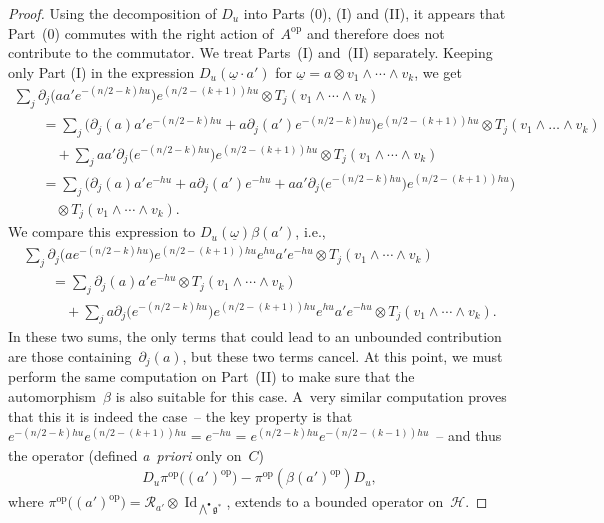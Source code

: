 \documentclass[11pt]{article}
\newcommand{\Core}{C}
\newcommand{\Hh}{\mathscr{H}}
\newcommand{\LieG}{\mathfrak{g}}
\newcommand{\omegat}{\underline{\omega}}
\newcommand{\RightMult}{\mathcal{R}}
\DeclareMathOperator{\id}{Id}
\numberwithin{equation}{section}
\begin{document}
\begin{proof}
Using the decomposition of $D_u$ into Parts (0), (I) and (II), it appears that Part~(0) commutes with the right action of~$A^\text{op}$ and therefore does not contribute to the commutator. We treat Parts~(I) and~(II) separately. Keeping only Part (I) in the expression $D_u( \omegat \cdot a')$ for $\omegat = a \otimes v_1 \wedge \cdots \wedge v_k$, we get
\begin{gather*}
\sum_j \partial_j\big(a a' e^{-(n/2 - k)h u} \big) e^{(n/2 - (k+1))h u} \otimes T_j( v_1 \wedge \cdots \wedge v_k) \\
\qquad{}
= \sum_j \big(\partial_j( a) a' e^{-(n/2 - k)h u} + a \partial_j(a') e^{-(n/2 - k)h u}\big) e^{(n/2 - (k+1))h u}
 \otimes T_j( v_1 \wedge \ldots \wedge v_k) \\
 \qquad\quad{}
+ \sum_{j} a a' \partial _j\big(e^{-(n/2 - k)h u}\big) e^{(n/2 - (k+1))h u} \otimes T_j(v_1 \wedge \cdots \wedge v_k)\\
\qquad{}
= \sum_{j} \big(\partial _j(a) a' e^{- h u} + a \partial _j(a') e^{-hu} + a a' \partial _j\big(e^{-(n/2 - k)h u}\big) e^{(n/2 - (k+1))h u} \big)\\
\qquad\quad{}
 \otimes T_j(v_1 \wedge \cdots \wedge v_k).
\end{gather*}
We compare this expression to $D_u(\omegat) \beta(a')$, i.e.,
\begin{gather*}
\sum_j \partial_j\big(a e^{-(n/2 - k)h u} \big) e^{(n/2 - (k+1))h u} e^{h u} a' e^{-hu} \otimes T_j( v_1 \wedge \cdots \wedge v_k) \\
\qquad{}= \sum_j \partial_j(a) a' e^{-h u} \otimes T_j( v_1 \wedge \cdots \wedge v_k) \\
\qquad\quad{} + \sum_{j} a \partial _j\big(e^{-(n/2 - k)h u} \big) e^{(n/2 - (k+1))h u} e^{h u} a' e^{-hu} \otimes T_j( v_1 \wedge \cdots \wedge v_k).
\end{gather*}
In these two sums, the only terms that could lead to an unbounded contribution are those containing~$\partial _j(a)$, but these two terms cancel. At this point, we must perform the same computation on Part~(II) to make sure that the automorphism~$\beta$ is also suitable for this case. A~very similar computation proves that this it is indeed the case~-- the key property is that $e^{-(n/2 - k)h u} e^{(n/2 - (k+1))h u} = e^{- hu} = e^{(n/2 - k)h u} e^{-(n/2 - (k-1))h u}$~-- and thus the operator (def\/ined \textit{a~priori} only on~$\Core$)
\begin{gather*}
D_u \pi^\text{op}\big( (a')^\text{op} \big) - \pi^\text{op}( \beta(a')^\text{op}) D_u,
\end{gather*}
where $\pi^\text{op}\big( (a')^\text{op} \big) = \RightMult_{a'} \otimes \id_{\bigwedge^\bullet \LieG^*}$, extends to a bounded operator on~$\Hh$.
\end{proof}
\end{document}

